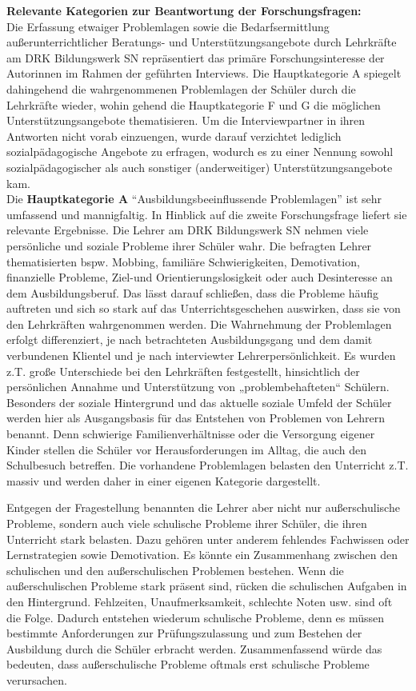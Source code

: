 \noindent
\textbf{Relevante Kategorien zur Beantwortung der Forschungsfragen:}\\

\noindent
Die Erfassung etwaiger Problemlagen sowie die Bedarfsermittlung außerunterrichtlicher Beratungs- und Unterstützungsangebote durch Lehrkräfte am DRK Bildungswerk SN repräsentiert das primäre Forschungsinteresse der Autorinnen im Rahmen der geführten Interviews. Die Hauptkategorie A spiegelt dahingehend die wahrgenommenen Problemlagen der Schüler durch die Lehrkräfte wieder, wohin gehend die Hauptkategorie F und G die möglichen Unterstützungsangebote thematisieren. Um die Interviewpartner in ihren Antworten nicht vorab einzuengen, wurde darauf verzichtet lediglich sozialpädagogische Angebote zu erfragen, wodurch es zu einer Nennung sowohl sozialpädagogischer als auch sonstiger (anderweitiger) Unterstützungsangebote kam.\\

\noindent
Die \textbf{Hauptkategorie A} "`Ausbildungsbeeinflussende Problemlagen"' ist sehr umfassend und mannigfaltig. In Hinblick auf die zweite Forschungsfrage liefert sie relevante Ergebnisse. Die Lehrer am DRK Bildungswerk SN nehmen viele persönliche und soziale Probleme ihrer Schüler wahr. Die befragten Lehrer thematisierten bspw. Mobbing, familiäre Schwierigkeiten, Demotivation, finanzielle Probleme, Ziel-und Orientierungslosigkeit oder auch Desinteresse an dem Ausbildungsberuf. Das lässt darauf schließen, dass die Probleme häufig auftreten und sich so stark auf das Unterrichtsgeschehen auswirken, dass sie von den Lehrkräften wahrgenommen werden. Die Wahrnehmung der Problemlagen erfolgt differenziert, je nach betrachteten Ausbildungsgang und dem damit verbundenen Klientel und je nach interviewter Lehrerpersönlichkeit. Es wurden z.T. große Unterschiede bei den Lehrkräften festgestellt, hinsichtlich der persönlichen Annahme und Unterstützung von „problembehafteten“ Schülern. Besonders der soziale Hintergrund und das aktuelle soziale Umfeld der Schüler werden hier als Ausgangsbasis für das Entstehen von Problemen von Lehrern benannt. Denn schwierige Familienverhältnisse oder die Versorgung eigener Kinder stellen die Schüler vor Herausforderungen im Alltag, die auch den Schulbesuch betreffen. Die vorhandene Problemlagen belasten den Unterricht z.T. massiv und werden daher in einer eigenen Kategorie dargestellt.

Entgegen der Fragestellung benannten die Lehrer aber nicht nur außerschulische Probleme, sondern auch viele schulische Probleme ihrer Schüler, die ihren Unterricht stark belasten. Dazu gehören unter anderem fehlendes Fachwissen oder Lernstrategien sowie Demotivation. Es könnte ein Zusammenhang zwischen den schulischen und den außerschulischen Problemen bestehen. Wenn die außerschulischen Probleme stark präsent sind, rücken die schulischen Aufgaben in den Hintergrund. Fehlzeiten, Unaufmerksamkeit, schlechte Noten usw. sind oft die Folge. Dadurch entstehen wiederum schulische Probleme, denn es müssen bestimmte Anforderungen zur Prüfungszulassung und zum Bestehen der Ausbildung durch die Schüler erbracht werden. Zusammenfassend würde das bedeuten, dass außerschulische Probleme oftmals erst schulische Probleme verursachen.\\

